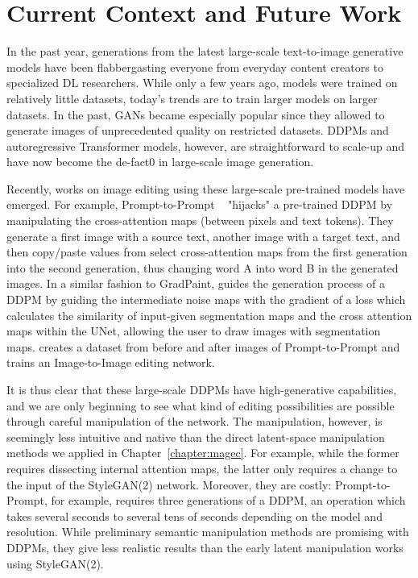 \section{Current Context and Future Work}
In the past year, generations from the latest large-scale text-to-image generative models have been flabbergasting 
everyone from everyday content creators to specialized \ac{DL} researchers. While only a few years ago, models were 
trained on relatively little datasets, today's trends are to train larger models on larger datasets. 
In the past, \ac{GAN}s became especially popular since they allowed to generate images of unprecedented quality on restricted datasets.
\ac{DDPM}s and autoregressive Transformer models, however, are straightforward to scale-up and have now become the de-fact0 in large-scale 
 image generation.

 Recently, works on image editing using these large-scale pre-trained models have emerged. For example, Prompt-to-Prompt 
~\citep{hertz2022prompt} "hijacks" a pre-trained \ac{DDPM} by manipulating the cross-attention maps 
 (between pixels and text tokens). They generate a first image with a source text, another image 
 with a target text, and then copy/paste values from select cross-attention maps from the first generation into the second generation, thus 
 changing word A into word B in the generated images. In a similar fashion to GradPaint, \cite{zestguide2023} guides the generation 
 process of a \ac{DDPM} by guiding the intermediate noise maps with the gradient of a loss which 
 calculates the similarity of input-given segmentation maps and the cross attention maps within the UNet, allowing the user
 to draw images with segmentation maps. \cite{brooks2022instructpix2pix} creates a dataset from before and after images of Prompt-to-Prompt and trains an 
 Image-to-Image editing network. 
 
It is thus clear that these large-scale \ac{DDPM}s have high-generative capabilities, and we are only beginning to see what kind of editing 
possibilities are possible through careful manipulation of the network. The manipulation, however, is seemingly less intuitive and native than the 
direct latent-space manipulation methods we applied in Chapter~\ref{chapter:magec}. For example, while the former requires dissecting internal attention maps, 
the latter only requires a change to the input of the StyleGAN(2) network. Moreover, they are costly: Prompt-to-Prompt, for example, requires 
three generations of a \ac{DDPM}, an operation which takes several seconds to several tens of seconds depending on the model and resolution.   While preliminary semantic manipulation methods are promising with \ac{DDPM}s, 
they give less realistic results than the early latent manipulation works using StyleGAN(2). 


